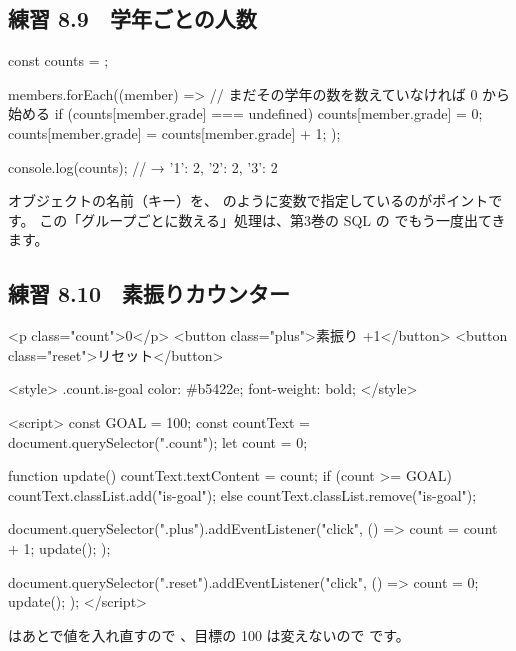 \subsection*{練習 8.9　学年ごとの人数}
\begin{Piton}[language=code]
const counts = {};

members.forEach((member) => {
  // まだその学年の数を数えていなければ 0 から始める
  if (counts[member.grade] === undefined) {
    counts[member.grade] = 0;
  }
  counts[member.grade] = counts[member.grade] + 1;
});

console.log(counts);   // → { '1': 2, '2': 2, '3': 2 }
\end{Piton}
オブジェクトの名前（キー）を、 のように変数で指定しているのがポイントです。
この「グループごとに数える」処理は、第3巻の SQL の  でもう一度出てきます。

\subsection*{練習 8.10　素振りカウンター}
\begin{Piton}[language=code]
<p class="count">0</p>
<button class="plus">素振り +1</button>
<button class="reset">リセット</button>

<style>
  .count.is-goal { color: #b5422e; font-weight: bold; }
</style>

<script>
  const GOAL = 100;
  const countText = document.querySelector(".count");
  let count = 0;

  function update() {
    countText.textContent = count;
    if (count >= GOAL) {
      countText.classList.add("is-goal");
    } else {
      countText.classList.remove("is-goal");
    }
  }

  document.querySelector(".plus").addEventListener("click", () => {
    count = count + 1;
    update();
  });

  document.querySelector(".reset").addEventListener("click", () => {
    count = 0;
    update();
  });
</script>
\end{Piton}
 はあとで値を入れ直すので 、目標の 100 は変えないので  です。

